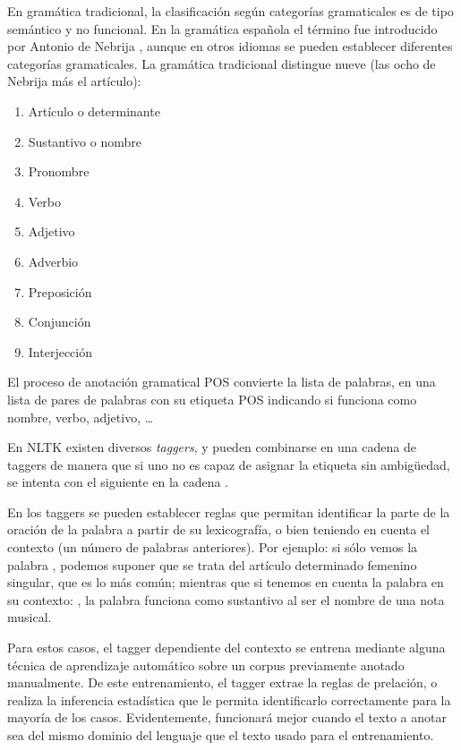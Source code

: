 En gramática tradicional, la clasificación según categorías gramaticales es de tipo semántico y no funcional. En la gramática española el término fue introducido por Antonio de Nebrija \citep[Categoría gramatical]{wikipedia-es}, aunque en otros idiomas se pueden establecer diferentes categorías gramaticales. La gramática tradicional distingue nueve  (las ocho de Nebrija más el artículo):
\nopagebreak
\begin{enumerate}
\item Artículo o determinante
\item Sustantivo o nombre
\item Pronombre
\item Verbo
\item Adjetivo
\item Adverbio
\item Preposición
\item Conjunción
\item Interjección
\end{enumerate}

El proceso de anotación gramatical POS convierte la lista de palabras, en una lista de pares de palabras con su etiqueta POS indicando si funciona como nombre, verbo, adjetivo, \ldots

En NLTK existen diversos \emph{taggers}, y pueden combinarse en una cadena de taggers de manera que si uno no es capaz de asignar la etiqueta sin ambigüedad, se intenta con el siguiente en la cadena \citep{Perkins2010}.

En los taggers se pueden establecer reglas que permitan identificar la parte de la oración de la palabra a partir de su lexicografía, o bien teniendo en cuenta el contexto (un número de palabras anteriores). Por ejemplo: si sólo vemos la palabra , podemos suponer que se trata del artículo determinado femenino singular, que es lo más común; mientras que si tenemos en cuenta la palabra en su contexto: , la palabra  funciona como sustantivo al ser el nombre de una nota musical.

Para estos casos, el tagger dependiente del contexto se entrena mediante alguna técnica de aprendizaje automático sobre un corpus previamente anotado manualmente. De este entrenamiento, el tagger extrae la reglas de prelación, o realiza la inferencia estadística que le permita identificarlo correctamente para la mayoría de los casos. Evidentemente, funcionará mejor cuando el texto a anotar sea del mismo dominio del lenguaje que el texto usado para el entrenamiento.

